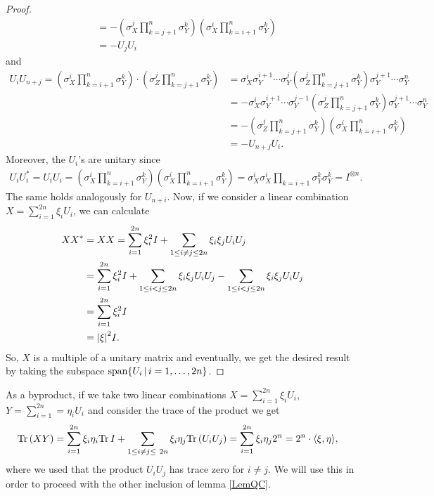 \begin{proof}
\begin{align*}
&= - ( \sigma_X^j \prod_{k = j+1}^{n}\sigma_Y^k)(\sigma_X^i \prod_{k = i+1}^{n}\sigma_Y^k)  \\
&= -U_jU_i
\end{align*}
and 
\begin{align*}
U_iU_{n+j} =  (\sigma_X^i \prod_{k = i+1}^{n}\sigma_Y^k) \cdot( \sigma_Z^j \prod_{k = j+1}^{n}\sigma_Y^k) &=
\sigma_X^i \sigma_Y^{i+1} \cdots \sigma_Y^j ( \sigma_Z^j \prod_{k = j+1}^{n}\sigma_Y^k) \sigma_Y^{j+1} \cdots \sigma_Y^n \\
&= - \sigma_X^i \sigma_Y^{i+1} \cdots \sigma_Y^{j-1} ( \sigma_Z^j \prod_{k = j+1}^{n}\sigma_Y^k) \sigma_Y^{j+1} \cdots \sigma_Y^n  \\
&= - ( \sigma_Z^j \prod_{k = j+1}^{n}\sigma_Y^k)(\sigma_X^i \prod_{k = i+1}^{n}\sigma_Y^k)  \\
&= -U_{n+j}U_i.
\end{align*}
Moreover, the $ U_i $'s are unitary since 
\begin{align*} 
U_iU_i^* =U_iU_i=  ( \sigma_X^i \prod_{k = i+1}^{n}\sigma_Y^k)( \sigma_X^i \prod_{k = i+1}^{n}\sigma_Y^k)= \sigma_X^i\sigma_X^i \prod_{k = i+1} \sigma_Y^k \sigma_Y^k = I^{\otimes n}.
\end{align*}
The same holds analogously for $ U_{n+i} $.
Now, if we consider a linear combination $ X = \sum_{i = 1}^{2n}\xi_i U_i$, we can calculate 
\begin{align*}
XX^* &= XX = \sum_{i = 1}^{2n} \xi_i^2 I + \sum_{1 \le i\neq j \le  2n}\xi_i\xi_j U_i U_j   \\
&= \sum_{i = 1}^{2n} \xi_i^2 I + \sum_{1 \le i < j \le  2n}\xi_i\xi_jU_iU_j - \sum_{1 \le i < j \le  2n}\xi_i\xi_jU_iU_j \\
&=\sum_{i = 1}^{2n} \xi_i^2 I \\
&= {\left|{\xi}\right|}^2 I.
\end{align*}
So, $ X $ is a multiple of a unitary matrix and eventually, we get the desired result by taking the subspace $ \textup{span} \{ U_i \, | \, i = 1,\hdots,2n \} $.

\end{proof}
As a byproduct, if we take two linear combinations $ X = \sum_{i = 1}^{2n}\xi_i U_i$, $ Y = \sum_{i = 1}^{2n} = \eta_iU_i $ and consider the trace of the product we get
\begin{align}\label{traceUi}
	\textup{Tr} \, {(XY)}  &= \sum_{i = 1}^{2n} \xi_i \eta_i  \textup{Tr} \, {I}  + \sum_{1 \le i \neq j \le \ 2n}\xi_i\eta_j \textup{Tr} \, {(U_i U_j)}   = \sum_{i= 1}^{2n}\xi_i \eta_j 2^n = 2^n \cdot \langle \xi, \eta \rangle,
\end{align}
where we used that the product $ U_iU_j $ has trace zero for $ i \neq j $.
We will use this in order to proceed with the other inclusion of lemma \ref{LemQC}.

